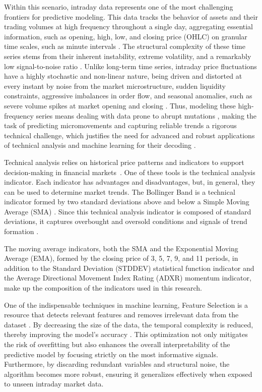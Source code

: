 \documentclass{ieeeaccess}
\begin{document}
Within this scenario, intraday data represents one of the most challenging frontiers for predictive modeling. This data tracks the behavior of assets and their trading volumes at high frequency throughout a single day, aggregating essential information, such as opening, high, low, and closing price (OHLC) on granular time scales, such as minute intervals \cite{macherla2025intraday}. The structural complexity of these time series stems from their inherent instability, extreme volatility, and a remarkably low signal-to-noise ratio \cite{zhang2025informer}. Unlike long-term time series, intraday price fluctuations have a highly stochastic and non-linear nature, being driven and distorted at every instant by noise from the market microstructure, sudden liquidity constraints, aggressive imbalances in order flow, and seasonal anomalies, such as severe volume spikes at market opening and closing \cite{nepal2025incorporating}. Thus, modeling these high-frequency series means dealing with data prone to abrupt mutations \cite{borkar2026empirical}, making the task of predicting micromovements and capturing reliable trends a rigorous technical challenge, which justifies the need for advanced and robust applications of technical analysis and machine learning for their decoding \cite{macherla2025intraday}.

Technical analysis relies on historical price patterns and indicators to support decision-making in financial markets~\cite{nazario2017literature}.
One of these tools is the technical analysis indicator. Each indicator has advantages and disadvantages, but, in general, they can be used to determine market trends. The Bollinger Band is a technical indicator formed by two standard deviations above and below a Simple Moving Average (SMA) \cite{bollinger1992using}. Since this technical analysis indicator is composed of standard deviations, it captures overbought and oversold conditions and signals of trend formation \cite{chen2018bollinger}. 

The moving average indicators, both the SMA and the Exponential Moving Average (EMA), formed by the closing price of 3, 5, 7, 9, and 11 periods, in addition to the Standard Deviation (STDDEV) statistical function indicator and the Average Directional Movement Index Rating (ADXR) momentum indicator, make up the composition of the indicators used in this research.

One of the indispensable techniques in machine learning, Feature Selection is a resource that detects relevant features and removes irrelevant data from the dataset \cite{kumar2014feature}. By decreasing the size of the data, the temporal complexity is reduced, thereby improving the model's accuracy \cite{venkatesh2019review}.%
This optimization not only mitigates the risk of overfitting but also enhances the overall interpretability of the predictive model by focusing strictly on the most informative signals. Furthermore, by discarding redundant variables and structural noise, the algorithm becomes more robust, ensuring it generalizes effectively when exposed to unseen intraday market data.
\end{document}
